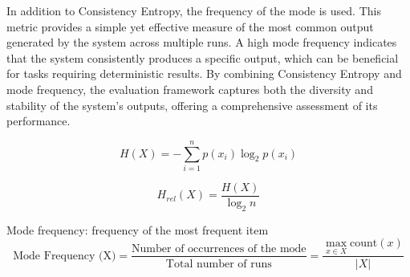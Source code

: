 In addition to Consistency Entropy, the frequency of the mode is used. This metric provides a simple yet effective measure of the most common output generated by the system across multiple runs. A high mode frequency indicates that the system consistently produces a specific output, which can be beneficial for tasks requiring deterministic results. By combining Consistency Entropy and mode frequency, the evaluation framework captures both the diversity and stability of the system's outputs, offering a comprehensive assessment of its performance.

\begin{equation}
    H(X) = - \sum_{i=1}^{n} p(x_i) \log_2 p(x_i)
\end{equation}

\begin{equation}
    H_{rel}(X) = \frac{H(X)}{\log_2 n} 
\end{equation}


Mode frequency: frequency of the most frequent item
\begin{equation}
    \text{Mode Frequency (X)} = \frac{\text{Number of occurrences of the mode}}{\text{Total number of runs}} = \frac{\max_{x \in X} \text{count}(x)}{|X|}
\end{equation}


